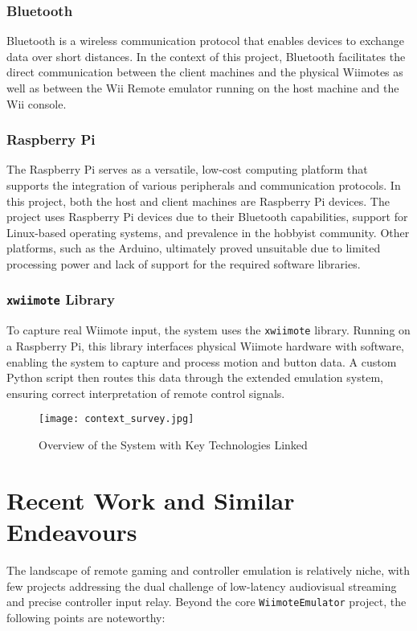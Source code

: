 \subsubsection{Bluetooth}
Bluetooth is a wireless communication protocol that enables devices to exchange data over short distances.  In the context of this project, Bluetooth facilitates the direct communication between the client machines and the physical Wiimotes as well as between the Wii Remote emulator running on the host machine and the Wii console.

\subsubsection{Raspberry Pi}
The Raspberry Pi serves as a versatile, low-cost computing platform that supports the integration of various peripherals and communication protocols. In this project, both the host and client machines are Raspberry Pi devices. The project uses Raspberry Pi devices due to their Bluetooth capabilities, support for Linux-based operating systems, and prevalence in the hobbyist community. Other platforms, such as the Arduino, ultimately proved unsuitable due to limited processing power and lack of support for the required software libraries.

\subsubsection{\texttt{xwiimote} Library\cite{xwiimote}}
To capture real Wiimote input, the system uses the \texttt{xwiimote} library. Running on a Raspberry Pi, this library interfaces physical Wiimote hardware with software, enabling the system to capture and process motion and button data. A custom Python script then routes this data through the extended emulation system, ensuring correct interpretation of remote control signals.

\begin{figure}[ht]
	\centering
	\texttt{[image: context\_survey.jpg]}
	\caption{Overview of the System with Key Technologies Linked}
	\label{fig:context_survey}
\end{figure}



\section{Recent Work and Similar Endeavours}

The landscape of remote gaming and controller emulation is relatively niche, with few projects addressing the dual challenge of low-latency audiovisual streaming and precise controller input relay. Beyond the core \texttt{WiimoteEmulator} project, the following points are noteworthy:

